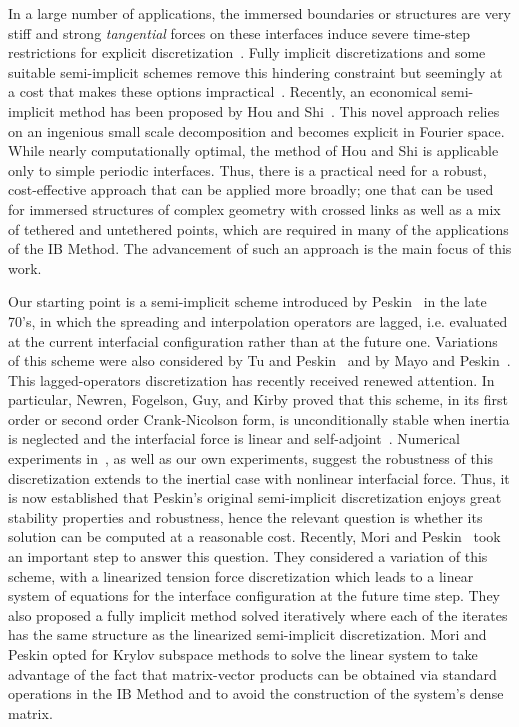 \documentclass[preprint,12pt]{elsarticle}
\begin{document}
In a large number of applications, the immersed boundaries or structures are very stiff and strong {\em tangential}
forces on these interfaces induce severe time-step restrictions for explicit discretization~\cite{SW95,SW99}. Fully implicit discretizations and some suitable semi-implicit schemes remove this hindering constraint but seemingly at a cost that makes these options impractical~\cite{TP92, MP93}.  Recently, an economical semi-implicit method has been proposed by Hou and Shi~\cite{HS2008a,HS2008b}. This novel approach relies on an ingenious  small scale decomposition and becomes explicit in Fourier space. While nearly computationally optimal, the method of Hou and Shi is applicable only to simple periodic interfaces. 
Thus, there is a practical need for a robust, cost-effective approach that can be applied more broadly; one that can be used
for immersed structures of complex geometry with crossed links as well as a mix of tethered and untethered points,  which are required in many of the applications of the IB Method.  The advancement of such an approach is the main focus of this work.

Our starting point is a semi-implicit scheme introduced by Peskin~\cite{Peskin77} in the late 70's, in which
the spreading and interpolation operators are lagged, i.e. evaluated at the current interfacial configuration rather than at the future one.  Variations of this scheme were also considered by Tu and Peskin~\cite{TP92} and by Mayo and Peskin~\cite{MP93}. This lagged-operators discretization has recently received renewed attention.  In particular, Newren, Fogelson, Guy, and Kirby
proved that this scheme, in its first order or second order Crank-Nicolson form, is unconditionally stable when inertia is neglected and the interfacial  force is linear and self-adjoint~\cite{NFGK2007}. Numerical experiments in~\cite{NFGK2007}, as well as our own experiments, suggest the robustness of this discretization extends to the inertial case with nonlinear interfacial force.
 Thus, it is now established that 
Peskin's original semi-implicit discretization enjoys great stability properties and robustness, 
hence the relevant question is whether its solution  can be computed at a reasonable cost. Recently, Mori and Peskin~\cite{MP2008}  took an important step to answer this question. 
They considered a variation of this scheme, with a linearized tension force discretization which leads to a linear system of equations for the interface configuration at the future time step. They also proposed a fully implicit method solved iteratively where each of the iterates has the same structure as the linearized semi-implicit discretization.  Mori and Peskin opted for Krylov subspace methods to solve the linear system to take advantage of the  fact that matrix-vector products can be obtained via standard operations in the IB Method and to avoid the construction of the system's dense matrix. 
\end{document}
